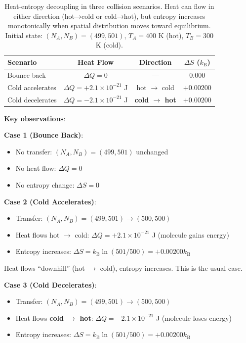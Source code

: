 \documentclass[10pt,twocolumn,letterpaper]{article}
\theoremstyle{definition}
\theoremstyle{remark}
\newcommand{\kb}{k_\text{B}}
\begin{document}
\begin{table}[h]
\centering
\caption{Heat-entropy decoupling in three collision scenarios. Heat can flow in either direction (hot→cold or cold→hot), but entropy increases monotonically when spatial distribution moves toward equilibrium. Initial state: $(N_A, N_B) = (499, 501)$, $T_A = 400$ K (hot), $T_B = 300$ K (cold).}
\label{tab:heat_entropy_decoupling}
\begin{tabular}{lccc}
\toprule
\textbf{Scenario} & \textbf{Heat Flow} & \textbf{Direction} & \textbf{$\Delta S$ ($\kb$)} \\
\midrule
Bounce back & $\Delta Q = 0$ & --- & $0.000$ \\
Cold accelerates & $\Delta Q = +2.1 \times 10^{-21}$ J & hot $\to$ cold & $+0.00200$ \\
Cold decelerates & $\Delta Q = -2.1 \times 10^{-21}$ J & \textbf{cold $\to$ hot} & $+0.00200$ \\
\bottomrule
\end{tabular}
\end{table}

\textbf{Key observations}:

\textbf{Case 1 (Bounce Back)}:
\begin{itemize}
\item No transfer: $(N_A, N_B) = (499, 501)$ unchanged
\item No heat flow: $\Delta Q = 0$
\item No entropy change: $\Delta S = 0$
\end{itemize}

\textbf{Case 2 (Cold Accelerates)}:
\begin{itemize}
\item Transfer: $(N_A, N_B) = (499, 501) \to (500, 500)$
\item Heat flows hot $\to$ cold: $\Delta Q = +2.1 \times 10^{-21}$ J (molecule gains energy)
\item Entropy increases: $\Delta S = \kb \ln(501/500) = +0.00200 \kb$
\end{itemize}

Heat flows ``downhill'' (hot $\to$ cold), entropy increases. This is the usual case.

\textbf{Case 3 (Cold Decelerates)}:
\begin{itemize}
\item Transfer: $(N_A, N_B) = (499, 501) \to (500, 500)$
\item Heat flows \textbf{cold $\to$ hot}: $\Delta Q = -2.1 \times 10^{-21}$ J (molecule loses energy)
\item Entropy increases: $\Delta S = \kb \ln(501/500) = +0.00200 \kb$
\end{itemize}
\end{document}
